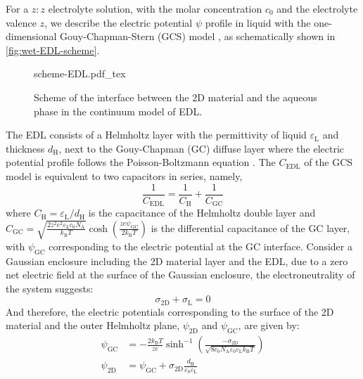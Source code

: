 For a \(z:z\) electrolyte solution, with the molar concentration
\(c_{0}\) and the electrolyte valence \(z\), we describe the electric
potential $\psi$ profile in liquid with the one-dimensional
Gouy-Chapman-Stern (GCS) model \cite{Stern_1924_theory}, as schematically
shown in \autoref{fig:wet-EDL-scheme}.
%
\begin{figure}[!htbp]
  \centering
  {scheme-EDL.pdf_tex}
  \caption{\label{fig:wet-EDL-scheme} Scheme of the interface between
    the 2D material and the aqueous phase in the continuum model of
    EDL.}
\end{figure}
The EDL consists of a
Helmholtz layer with the permittivity of liquid
\(\varepsilon_{\mathrm{L}}\) and thickness \(d_{\mathrm{H}}\), next to
the Gouy-Chapman (GC) diffuse layer where the electric potential
profile follows the Poisson-Boltzmann equation
\cite{Bard_1980_electrochem_book}.
%
The \(C_{\mathrm{EDL}}\) of the
GCS model is equivalent to two capacitors in series,
namely,
\begin{equation}
\label{eqn:wet-GCS-capacitance-series}
\frac{1}{C_{\mathrm{EDL}}} = \frac{1}{C_{\mathrm{H}}} + \frac{1}{C_{\mathrm{GC}}}
\end{equation}
where \(C_{\mathrm{H}}=\varepsilon_{\mathrm{L}}/d_{\mathrm{H}}\) is the
capacitance of the Helmholtz double layer and
\(C_{\mathrm{GC}}=\sqrt{\frac{2z^{2}e^{2}\varepsilon_{\mathrm{L}}c_{0}N_{\mathrm{A}}}{k_{\mathrm{B}}T}}
\cosh(\frac{ze\psi_{\mathrm{GC}}}{2k_{\mathrm{B}}T})\) is the
differential capacitance of the GC layer, with \(\psi_{\mathrm{GC}}\)
corresponding to the electric potential at the GC interface.
%
Consider
a Gaussian enclosure including the 2D material layer and the EDL, due
to a zero net electric field at the surface of the Gaussian enclosure,
the electroneutrality of the system \cite{Bard_1980_electrochem_book}
suggests:
\begin{equation}
\label{eqn:wet-neutrality}
\sigma_{\mathrm{2D}} + \sigma_{\mathrm{L}} = 0
\end{equation}
And therefore, the electric potentials corresponding to the surface of
the 2D material and the outer Helmholtz plane, \(\psi_{\mathrm{2D}}\)
and \(\psi_{\mathrm{GC}}\), are given by:
\begin{equation}
\label{eqn:wet-psi-GC}
\begin{aligned}
  \psi_{\mathrm{GC}} &= -\frac{2k_{\mathrm{B}}T}{ze} 
                         \sinh^{-1}\left(
                         \frac{-\sigma_{\mathrm{2D}}}{\sqrt{8c_{0}N_{\mathrm{A}}\varepsilon_{0}\varepsilon_{\mathrm{L}}k_{\mathrm{B}}T}}
                            \right) \\
  \psi_{\mathrm{2D}} &= \psi_{\mathrm{GC}} + \sigma_{\mathrm{2D}}\frac{d_{\mathrm{H}}}{\varepsilon_{0}\varepsilon_{\mathrm{L}}}
\end{aligned}
\end{equation}
